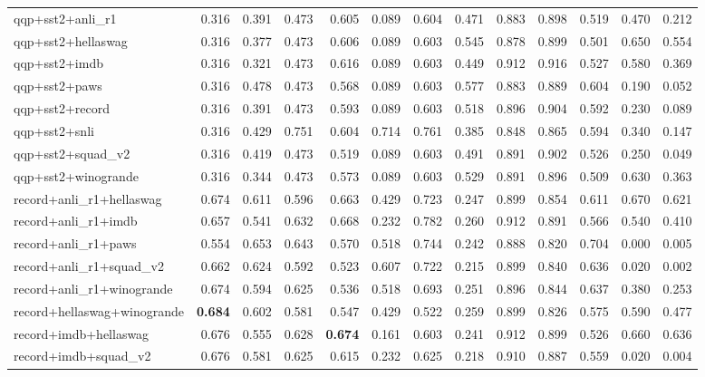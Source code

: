 \begin{table}[t]
\begin{tabular}{lrrrrrrrrrrrr}
    qqp+sst2+anli\_r1 & 0.316 & 0.391 & 0.473 & 0.605 & 0.089 & 0.604 & 0.471 & 0.883 & 0.898 & 0.519 & 0.470 & 0.212 \\
    qqp+sst2+hellaswag & 0.316 & 0.377 & 0.473 & 0.606 & 0.089 & 0.603 & 0.545 & 0.878 & 0.899 & 0.501 & 0.650 & 0.554 \\
    qqp+sst2+imdb & 0.316 & 0.321 & 0.473 & 0.616 & 0.089 & 0.603 & 0.449 & 0.912 & 0.916 & 0.527 & 0.580 & 0.369 \\
    qqp+sst2+paws & 0.316 & 0.478 & 0.473 & 0.568 & 0.089 & 0.603 & 0.577 & 0.883 & 0.889 & 0.604 & 0.190 & 0.052 \\
    qqp+sst2+record & 0.316 & 0.391 & 0.473 & 0.593 & 0.089 & 0.603 & 0.518 & 0.896 & 0.904 & 0.592 & 0.230 & 0.089 \\
    qqp+sst2+snli & 0.316 & 0.429 & 0.751 & 0.604 & 0.714 & 0.761 & 0.385 & 0.848 & 0.865 & 0.594 & 0.340 & 0.147 \\
    qqp+sst2+squad\_v2 & 0.316 & 0.419 & 0.473 & 0.519 & 0.089 & 0.603 & 0.491 & 0.891 & 0.902 & 0.526 & 0.250 & 0.049 \\
    qqp+sst2+winogrande & 0.316 & 0.344 & 0.473 & 0.573 & 0.089 & 0.603 & 0.529 & 0.891 & 0.896 & 0.509 & 0.630 & 0.363 \\
    record+anli\_r1+hellaswag & 0.674 & 0.611 & 0.596 & 0.663 & 0.429 & 0.723 & 0.247 & 0.899 & 0.854 & 0.611 & 0.670 & 0.621 \\
    record+anli\_r1+imdb & 0.657 & 0.541 & 0.632 & 0.668 & 0.232 & 0.782 & 0.260 & 0.912 & 0.891 & 0.566 & 0.540 & 0.410 \\
    record+anli\_r1+paws & 0.554 & 0.653 & 0.643 & 0.570 & 0.518 & 0.744 & 0.242 & 0.888 & 0.820 & 0.704 & 0.000 & 0.005 \\
    record+anli\_r1+squad\_v2 & 0.662 & 0.624 & 0.592 & 0.523 & 0.607 & 0.722 & 0.215 & 0.899 & 0.840 & 0.636 & 0.020 & 0.002 \\
    record+anli\_r1+winogrande & 0.674 & 0.594 & 0.625 & 0.536 & 0.518 & 0.693 & 0.251 & 0.896 & 0.844 & 0.637 & 0.380 & 0.253 \\
    record+hellaswag+winogrande & \textbf{0.684} & 0.602 & 0.581 & 0.547 & 0.429 & 0.522 & 0.259 & 0.899 & 0.826 & 0.575 & 0.590 & 0.477 \\
    record+imdb+hellaswag & 0.676 & 0.555 & 0.628 & \textbf{0.674} & 0.161 & 0.603 & 0.241 & 0.912 & 0.899 & 0.526 & 0.660 & 0.636 \\
    record+imdb+squad\_v2 & 0.676 & 0.581 & 0.625 & 0.615 & 0.232 & 0.625 & 0.218 & 0.910 & 0.887 & 0.559 & 0.020 & 0.004 \\

\end{tabular}
\end{table}
